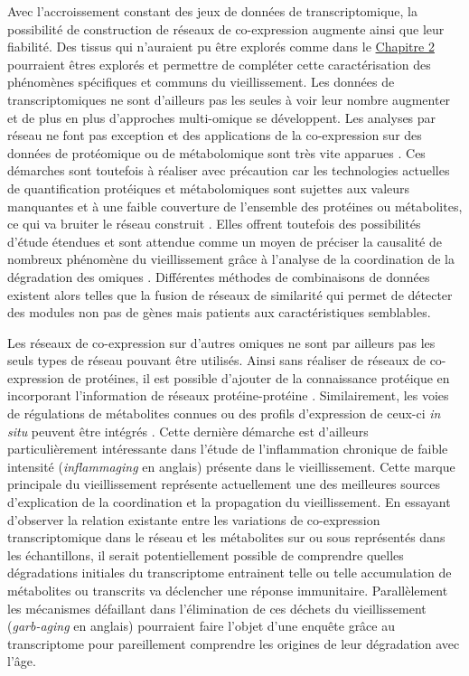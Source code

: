 Avec l'accroissement constant des jeux de données de transcriptomique, la possibilité de construction de réseaux de co-expression augmente ainsi que leur fiabilité. Des tissus qui n'auraient pu être explorés comme dans le \hyperref[chapter:multidim]{Chapitre 2} pourraient êtres explorés et permettre de compléter cette caractérisation des phénomènes spécifiques et communs du vieillissement. Les données de transcriptomiques ne sont d'ailleurs pas les seules à voir leur nombre augmenter et de plus en plus d'approches multi-omique se développent. Les analyses par réseau ne font pas exception et des applications de la co-expression sur des données de protéomique ou de métabolomique sont très vite apparues \cite{Hawe2019}. Ces démarches sont toutefois à réaliser avec précaution car les technologies actuelles de quantification protéiques et métabolomiques sont sujettes aux valeurs manquantes et à une faible couverture de l'ensemble des protéines ou métabolites, ce qui va bruiter le réseau construit \cite{Pei2017Jan}. Elles offrent toutefois des possibilités d'étude étendues et sont attendue comme un moyen de préciser la causalité de nombreux phénomène du vieillissement grâce à l'analyse de la coordination de la dégradation des omiques \cite{Solovev2020Jan}. Différentes méthodes de combinaisons de données existent alors telles que la fusion de réseaux de similarité \cite{Wang2014Mar} qui permet de détecter des modules non pas de gènes mais patients aux caractéristiques semblables.

Les réseaux de co-expression sur d'autres omiques ne sont par ailleurs pas les seuls types de réseau pouvant être utilisés. Ainsi sans réaliser de réseaux de co-expression de protéines, il est possible d'ajouter de la connaissance protéique en incorporant l'information de réseaux protéine-protéine \cite{Russo2018}. Similairement, les voies de régulations de métabolites connues ou des profils d'expression de ceux-ci \textit{in situ} peuvent être intégrés \cite{Yuan2018Oct}. Cette dernière démarche est d'ailleurs particulièrement intéressante dans l'étude de l'inflammation chronique de faible intensité (\textit{inflammaging} en anglais) présente dans le vieillissement. Cette marque principale du vieillissement représente actuellement une des meilleures sources d'explication de la coordination et la propagation du vieillissement. En essayant d'observer la relation existante entre les variations de co-expression transcriptomique dans le réseau et les métabolites sur ou sous représentés dans les échantillons, il serait potentiellement possible de comprendre quelles dégradations initiales du transcriptome entrainent telle ou telle accumulation de métabolites ou transcrits va déclencher une réponse immunitaire. Parallèlement les mécanismes défaillant dans l'élimination de ces déchets du vieillissement (\textit{garb-aging} en anglais) \cite{Franceschi2017} pourraient faire l'objet d'une enquête grâce au transcriptome pour pareillement comprendre les origines de leur dégradation avec l'âge.


